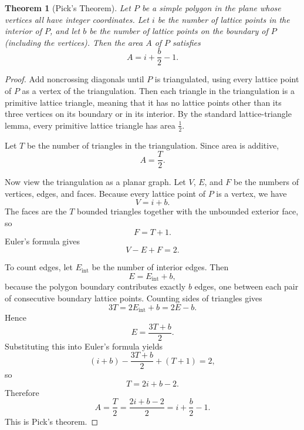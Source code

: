 \documentclass[11pt]{article}
\newtheorem{theorem}{Theorem}
\begin{document}
\begin{theorem}[Pick's Theorem]
\label{thm:pick}
Let $P$ be a simple polygon in the plane whose vertices all have integer
coordinates. Let $i$ be the number of lattice points in the interior of $P$,
and let $b$ be the number of lattice points on the boundary of $P$ (including
the vertices). Then the area $A$ of $P$ satisfies
\[
A=i+\frac{b}{2}-1.
\]
\end{theorem}

\begin{proof}
Add noncrossing diagonals until $P$ is triangulated, using every lattice
point of $P$ as a vertex of the triangulation. Then each triangle in the
triangulation is a primitive lattice triangle, meaning that it has no lattice
points other than its three vertices on its boundary or in its interior. By
the standard lattice-triangle lemma, every primitive lattice triangle has area
$\tfrac12$.

Let $T$ be the number of triangles in the triangulation. Since area is
additive,
\[
A=\frac{T}{2}.
\]

Now view the triangulation as a planar graph. Let $V$, $E$, and $F$ be the
numbers of vertices, edges, and faces. Because every lattice point of $P$ is a
vertex, we have
\[
V=i+b.
\]
The faces are the $T$ bounded triangles together with the unbounded exterior
face, so
\[
F=T+1.
\]
Euler's formula gives
\[
V-E+F=2.
\]

To count edges, let $E_{\mathrm{int}}$ be the number of interior edges. Then
\[
E=E_{\mathrm{int}}+b,
\]
because the polygon boundary contributes exactly $b$ edges, one between each
pair of consecutive boundary lattice points. Counting sides of triangles gives
\[
3T=2E_{\mathrm{int}}+b=2E-b.
\]
Hence
\[
E=\frac{3T+b}{2}.
\]
Substituting this into Euler's formula yields
\[
(i+b)-\frac{3T+b}{2}+(T+1)=2,
\]
so
\[
T=2i+b-2.
\]
Therefore
\[
A=\frac{T}{2}=\frac{2i+b-2}{2}=i+\frac{b}{2}-1.
\]
This is Pick's theorem.
\end{proof}
\end{document}
